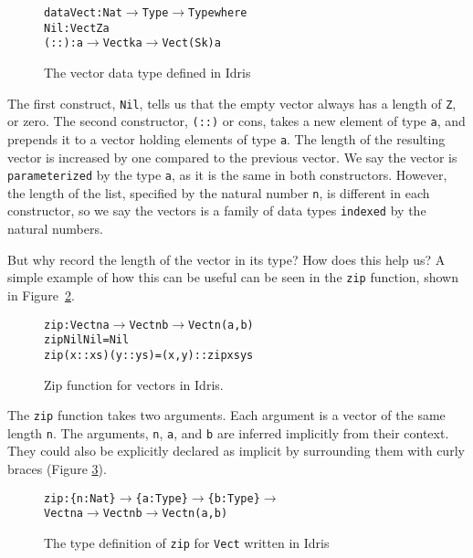 \begin{figure}
\begin{alltt}
data Vect : Nat \(\to\) Type \(\to\) Type where
  Nil  : Vect Z a
  (::) : a \(\to\) Vect k a \(\to\) Vect (S k) a
\end{alltt}
\caption{The vector data type defined in Idris}
\label{fig:vect}
\end{figure}

The first construct, \texttt{Nil}, tells us that the empty vector always has a length of \texttt{Z}, or zero. The second constructor, \texttt{(::)} or cons, takes a new element of type \texttt{a}, and prepends it to a vector holding elements of type \texttt{a}. The length of the resulting vector is increased by one compared to the previous vector. We say the vector is \texttt{parameterized} by the type \texttt{a}, as it is the same in both constructors. However, the length of the list, specified by the natural number \texttt{n}, is different in each constructor, so we say the vectors is a family of data types \texttt{indexed} by the natural numbers.

But why record the length of the vector in its type? How does this help us? A simple example of how this can be useful can be seen in the \texttt{zip} function, shown in Figure~\ref{fig:zip}.

\begin{figure}
\begin{alltt}
zip : Vect n a \(\to\) Vect n b \(\to\) Vect n (a, b)
zip Nil       Nil       = Nil
zip (x :: xs) (y :: ys) = (x, y) :: zip xs ys
\end{alltt}
\caption{Zip function for vectors in Idris.}
\label{fig:zip}
\end{figure}

The \texttt{zip} function takes two arguments. Each argument is a vector of the same length \texttt{n}. The arguments, \texttt{n}, \texttt{a}, and \texttt{b} are inferred implicitly from their context. They could also be explicitly declared as implicit by surrounding them with curly braces
(Figure \ref{fig:zip_implicit_args}).

\begin{figure}
	\begin{alltt}
	zip : \{n: Nat\} \(\to\) \{a: Type\} \(\to\) \{b: Type\} \(\to\) 
	      Vect n a \(\to\) Vect n b \(\to\) Vect n (a, b)
	\end{alltt}
\caption{The type definition of \texttt{zip} for \texttt{Vect} written in Idris}
\label{fig:zip_implicit_args}
\end{figure}

